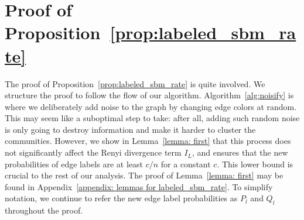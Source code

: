 \documentclass{article}
\begin{document}
\section{Proof of Proposition~\ref{prop:labeled_sbm_rate}}
\label{appendix: first}
The proof of Proposition~\ref{prop:labeled_sbm_rate} is quite involved. We structure the proof to follow the flow of our algorithm.  Algorithm~\ref{alg:noisify} is where we deliberately add noise to the graph by changing edge colors at random. This may seem like a suboptimal step to take: after all, adding such random noise is only going to destroy information and make it harder to cluster the communities. However, we show in Lemma~\ref{lemma: first} that this process does not significantly affect the Renyi divergence term $I_L$, and ensures that the new probabilities of edge labels are at least $c/n$ for a constant $c$. This lower bound is crucial to the rest of our analysis. The proof of Lemma~\ref{lemma: first} may be found in Appendix~\ref{appendix: lemmas for labeled_sbm_rate}. To simplify notation, we continue to refer the new edge label probabilities as $P_l$ and $Q_l$ throughout the proof.
\end{document}
